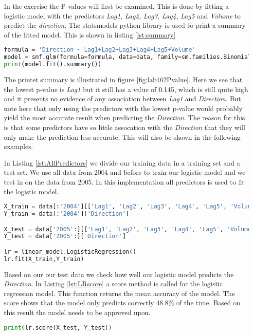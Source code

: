 In the exercise the P-values will first be examined. This is done by fitting a logistic model with the predictors \emph{Lag1, Lag2, Lag3, Lag4, Lag5} and \emph{Volume} to predict the \emph{direction}.  The statsmodels python library is used to print a summary of the fitted model. This is shown in listing \ref{lst:summary}
\begin{lstlisting}[language=Python, label=lst:summary caption=print correlation matrix]
formula = 'Direction ~ Lag1+Lag2+Lag3+Lag4+Lag5+Volume'
model = smf.glm(formula=formula, data=data, family=sm.families.Binomial())
print(model.fit().summary())
\end{lstlisting}


The printet summary is illustrated in figure \ref{fig:lab462Pvalue}. Here we see that the lowest p-value is \emph{Lag1} but it still has a value of 0.145, which is still quite high and it presents no evidence of any association between \emph{Lag1} and \emph{Direction}. But note here that only using the predictors with the lowest p-value would probably yield the most accurate result when predicting the \emph{Direction}. The reason for this is that some predictors have so little assocation with the \emph{Direction} that they will only make the prediction less accurate. This will also be shown in the following examples.

\FloatBarrier

In Listing \ref{lst:AllPredictors} we divide our training data in a training set and a test set. We use all data from 2004 and before to train our logistic model and we test in on the data from 2005.  In this implementation all predictors is used to fit the logistic model.

\begin{lstlisting}[language=Python, label=lst:AllPredictors, caption=Logistic regression using all predictors]
X_train = data[:'2004'][['Lag1', 'Lag2', 'Lag3', 'Lag4', 'Lag5', 'Volume']]
Y_train = data[:'2004']['Direction']

X_test = data['2005':][['Lag1', 'Lag2', 'Lag3', 'Lag4', 'Lag5', 'Volume']]
Y_test = data['2005':]['Direction']

lr = linear_model.LogisticRegression()
lr.fit(X_train,Y_train)
\end{lstlisting}

Based on our our test data we check how well our logistic model predicts the \emph{Direction}. In Listing \ref{lst:LRscore} a score method is called for the logistic regression model. This function returns the mean accuracy of the model. The score shows that the model only predicts correctly $48.8\%$ of the time. Based on this result the model needs to be approved upon.
\begin{lstlisting}[language=Python, label=lst:LRscore, caption=Logistic regression using all predictors]
print(lr.score(X_test, Y_test))
\end{lstlisting}

